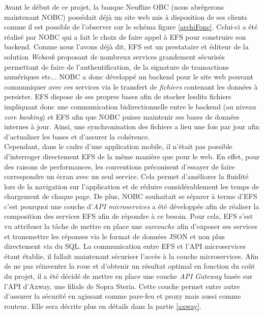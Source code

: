	Avant le début de ce projet, la banque Neuflize OBC (nous abrégerons maintenant NOBC) possédait déjà un site web mis à disposition de ses clients comme il est possible de l'observer sur le schéma figure \ref{archiFonc}. Celui-ci a été réalisé par NOBC qui a fait le choix de faire appel à EFS pour construire son backend. Comme nous l'avons déjà dit, EFS est un prestataire et éditeur de la solution \textit{Webank} proposant de nombreux services grandement sécurisés permettant de faire de l'authentification, de la signature de transactions numériques etc... NOBC a donc développé un backend pour le site web pouvant communiquer avec ces services via le transfert de \textit{fichiers} contenant les données à persister. EFS dispose de ses propres bases afin de stocker lesdits fichiers impliquant donc une communication bidirectionnelle entre le backend (au niveau \textit{core banking}) et EFS afin que NOBC puisse maintenir ses bases de données internes à jour. Ainsi, une synchronisation des fichiers a lieu une fois par jour afin d'actualiser les bases et d'assurer la cohérence. \\
	
	Cependant, dans le cadre d'une application mobile, il n'était pas possible d'interroger directement EFS de la même manière que pour le web. En effet, pour des raisons de performances, les conventions préconisent d'essayer de faire correspondre un écran avec un seul service. Cela permet d'améliorer la fluidité lors de la navigation sur l'application et de réduire considérablement les temps de chargement de chaque page. De plus, NOBC souhaitait se séparer à terme d'EFS c'est pourquoi une couche d'\textit{API microservices} a été développée afin de réaliser la composition des services EFS afin de répondre à ce besoin. Pour cela, EFS s'est vu attribuer la tâche de mettre en place une \textit{surcouche} afin d'exposer ses services et transmettre les réponses via le format de données JSON et non plus directement via du SQL. La communication entre EFS et l'API microservices étant établie, il fallait maintenant sécuriser l'accès à la couche microservices. Afin de ne pas réinventer la roue et d'obtenir un résultat optimal en fonction du coût du projet, il a été décidé de mettre en place une couche \textit{API Gateway} basée sur l'API d'Axway, une filiale de Sopra Steria. Cette couche permet entre autre d'assurer la sécurité en agissant comme pare-feu et proxy mais aussi comme routeur. Elle sera décrite plus en détails dans la partie \ref{axway}.\\
	
